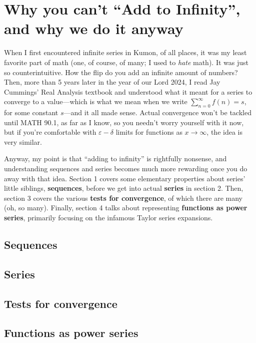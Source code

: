 \chapter{Why you can't ``Add to Infinity'', and why we do it anyway}
When I first encountered infinite series in Kumon, of all places, it was my least favorite part of math (one, of course, of many; I used to \textit{hate} math). 
It was just so counterintuitive. How the flip do you add an infinite amount of numbers? Then, more than 5 years later in the year of our Lord 2024, I read 
Jay Cummings' Real Analysis textbook and understood what it meant for a series to converge to a value---which is what we mean when we write \(\sum_{n=0}^{\infty} f(n) = s\), 
for some constant \(s\)---and it all made sense. Actual convergence won't be tackled until MATH 90.1, as far as I know, so you needn't worry yourself with it now, but if
you're comfortable with \(\varepsilon-\delta\) limits for functions as \(x \to \infty\), the idea is very similar.\par 
Anyway, my point is that ``adding to infinity'' is rightfully nonsense, and understanding sequences and series becomes much more rewarding once you do away 
with that idea. Section 1 covers some elementary properties about series' little siblings, \textbf{sequences}, before we get into actual \textbf{series} in section 2. 
Then, section 3 covers the various \textbf{tests for convergence}, of which there are many (oh, so many). Finally, section 4 talks about representing \textbf{functions as power series},
primarily focusing on the infamous Taylor series expansions.
\section{Sequences} 
\section{Series}
\section{Tests for convergence}
\section{Functions as power series}